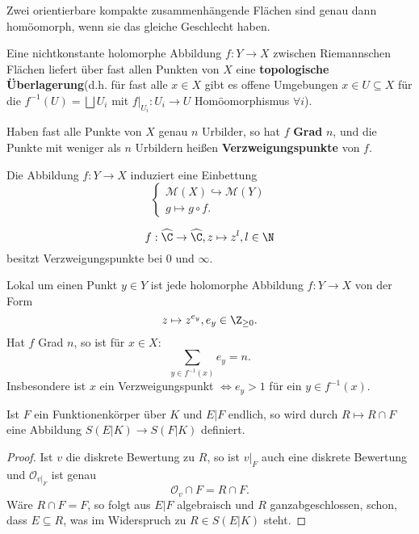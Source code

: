 \begin{theorem}
    Zwei orientierbare kompakte zusammenhängende Flächen sind genau dann homöomorph, wenn sie das gleiche Geschlecht haben.
\end{theorem}

\begin{bemerkungnr}
    Eine nichtkonstante holomorphe Abbildung $f: Y \to X$ zwischen Riemannschen Flächen liefert über fast allen Punkten von $X$ eine
    \textbf{topologische Überlagerung}(d.h. für fast alle $x \in X$ gibt es offene Umgebungen $x \in U \subseteq X$ für die
    $f^{-1}(U)=\bigsqcup U_i$ mit $f|_{U_i}: U_i \to U$ Homöomorphismus $\forall i$).

    Haben fast alle Punkte von $X$ genau $n$ Urbilder, so hat $f$ \textbf{Grad} $n$, und die Punkte mit weniger als $n$ Urbildern
    heißen \textbf{Verzweigungspunkte} von $f$.

    Die Abbildung $f: Y \to X$ induziert eine Einbettung
    $$ \begin{cases}
            \mathcal{M}(X) \hookrightarrow \mathcal{M}(Y)\\
            g \mapsto g \circ f.
        \end{cases}$$
\end{bemerkungnr}

\begin{beispiel}
    $$f : \widehat{\C} \to \widehat{\C}, z \mapsto z^l, l \in \N$$
    besitzt Verzweigungspunkte bei $0$ und $\infty$.
\end{beispiel}

\begin{bemerkungnr}
    Lokal um einen Punkt $y \in Y$ ist jede holomorphe Abbildung $f: Y \to X$ von der Form
    $$ z \mapsto z^{e_y}, e_y \in \Z_{\geq 0}.$$
    Hat $f$ Grad $n$, so ist für $x \in X$:
    $$ \sum\limits_{y \in f^{-1}(x)} e_y = n. $$
    Insbesondere ist $x$ ein Verzweigungspunkt $\iff e_y > 1$ für ein $y \in f^{-1}(x)$.
\end{bemerkungnr}

\begin{satz}
    Ist $F$ ein Funktionenkörper über $K$ und $E|F$ endlich, so wird durch $R \mapsto R \cap F$ eine Abbildung
    $S(E|K) \to S(F|K)$ definiert.
\end{satz}
\begin{proof}
    Ist $v$ die diskrete Bewertung zu $R$, so ist $v|_F$ auch eine diskrete Bewertung und 
    $\mathcal{O}_{v|_F}$ ist genau 
    $$ \mathcal{O}_v \cap F = R \cap F.$$
    Wäre $R\cap F = F$, so folgt aus $E|F$ algebraisch und $R$ ganzabgeschlossen, schon, dass $E \subseteq R$,
    was im Widerspruch zu $R \in S(E|K)$ steht.
\end{proof}

